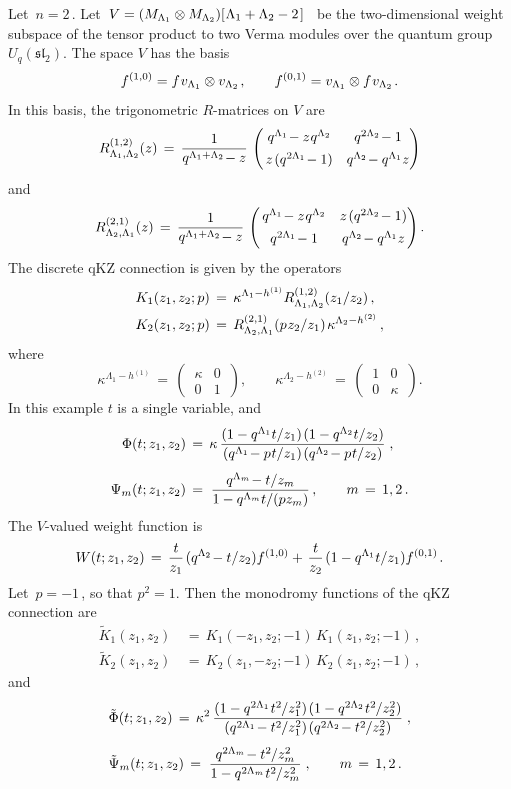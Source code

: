 \documentclass[12pt]{amsart}
\let\frak\mathfrak
\def\>{\relax\ifmmode\mskip.666667\thinmuskip\relax\else\kern.111111em\fi}
\def\<{\relax\ifmmode\mskip-.333333\thinmuskip\relax\else\kern-.0555556em\fi}
\theoremstyle{definition} %
\numberwithin{equation}{section}
\theoremstyle{definition}
\let\ka\kappa
\let\La\Lambda
\let\ox\otimes
\def\be{\begin{equation*}}
\def\ee{\end{equation*}}
\begin{document}
Let \,$n=2$\,. Let
\,$V=(M_{\La_1}\ox M_{\La_2})[\<\>\La_1+\La_2-2\>]$ \, be the two-dimensional
weight subspace of the tensor product to two Verma modules over the quantum
group $U_q(\frak{sl}_2)$. The space $V$ has the basis
\be
f^{(1,0)}=f\<\>v_{\La_1}\ox v_{\La_2}\>,\qquad
f^{(0,1)}=v_{\La_1}\ox f\<\>v_{\La_2}\>.
\ee
In this basis, the trigonometric $R$-matrices on $V$ are
\be
R^{(1,2)}_{\La_1,\La_2}(z)\,=\,\frac1{q^{\La_1+\La_2}\!-z}\,
\begin{pmatrix} \,q^{\La_1}\!-z\<\>q^{\La_2} & q^{2\La_2}\!-1\\[4pt]
\,z\>(q^{2\La_1}\!-1) & q^{\La_2}\!-q^{\La_1} z \end{pmatrix}
\ee
and
\be
R^{(2,1)}_{\La_2,\La_1}(z)\,=\,\frac1{q^{\La_1+\La_2}\!-z}\,
\begin{pmatrix} \,q^{\La_1}\!-z\<\>q^{\La_2} & z\>(q^{2\La_2}\!-1)\\[4pt]
\,q^{2\La_1}\!-1 & q^{\La_2}\!-q^{\La_1} z \end{pmatrix}.
\ee
The discrete qKZ connection is given by the operators
\begin{align*}
K_1(z_1,z_2;p)\,&{}=\,\ka^{\La_1-h^{(1)}}R^{(1,2)}_{\La_1,\La_2}(z_1/z_2)\,,
\\
K_2(z_1,z_2;p)\,&{}=\,R^{(2,1)}_{\La_2,\La_1}(p\<\>z_2/z_1)\>\ka^{\La_2-h^{(2)}}\,,
\end{align*}
where
\be
\ka^{\La_1-h^{(1)}}\,=\,\begin{pmatrix} \,\ka & 0\,\\[2pt] \,0 & 1\,\end{pmatrix},\qquad
\ka^{\La_2-h^{(2)}}\,=\,\begin{pmatrix} \,1 & 0\,\\[2pt] \,0 & \ka\,\end{pmatrix}.
\ee
In this example $t$ is a single variable, and
\begin{align*}
\Phi(t;z_1,z_2)\,&{}=\,\ka\,
\frac{(1-q^{\La_1}t/z_1)\>(1-q^{\La_2}t/z_2)}{(q^{\La_1}\!-p\<\>t/z_1)\>(q^{\La_2}\!-p\<\>t/z_2)}\;,
\\[4pt]
\Psi_m(t;z_1,z_2)\,&{}=\;\frac{q^{\La_m}\!-t/z_m}{1-q^{\La_m}t/(pz_m)}\,,\qquad m\,=\,1,2\,.
\end{align*}
The $V$-valued weight function is
\be
W(t;z_1,z_2)\,=\,\frac t{z_1}\>(q^{\La_2}\!-t/z_2) f^{(1,0)} +\>
\frac t{z_2}\>(1-q^{\La_1}t/z_1) f^{(0,1)}\>.
\ee
Let \,$p=-1$\,, so that $p^2=1$. Then the monodromy functions of the qKZ connection are
\begin{align*}
\tilde K_1(z_1,z_2)\,&{}=\,K_1(-z_1,z_2;-1)\,K_1(z_1,z_2;-1)\,,
\\
\tilde K_2(z_1,z_2)\,&{}=\,K_2(z_1,-z_2;-1)\,K_2(z_1,z_2;-1)\,,
\end{align*}
and
\begin{align*}
& \tilde\Phi(t;z_1,z_2)\,=\,
\ka^2\,\frac{(1-q^{2\La_1}\<\>t^2\</z_1^2)\>(1-q^{2\La_2}\<\>t^2\</z_2^2)}
{(q^{2\La_1}\!-t^2\</z_1^2)\>(q^{2\La_2}\!-t^2\</z_2^2)}\;,
\\[4pt]
& \tilde\Psi_m(t;z_1,z_2)\,=\;\frac{q^{2\La_m}\!-t^2\</z_m^2}{1-q^{2\La_m}\<\>t^2\</z_m^2}\;,
\qquad m\,=\,1,2\,.
\end{align*}
\end{document}
